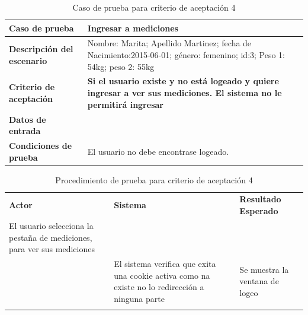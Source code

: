 \documentclass[a4paper,12pt]{article}
\begin{document}
		{\scriptsize
    \begin{table} [h]
    \centering
	\begin{tabular}{||l|p{10cm}||}
    	\rowcolor[gray]{0.9}
	    \hline 
        \hline 
		\textbf{Caso de prueba} & \textbf{Ingresar a mediciones} \\  \hline
	    \textbf{Descripción del escenario}& Nombre: Marita; Apellido Martinez; fecha de Nacimiento:2015-06-01; género: femenino; id:3; Peso 1: 54kg; peso 2: 55kg\\ \hline
	    \textbf{Criterio de aceptación}&\textbf{Si el usuario existe y no está logeado y quiere ingresar a ver sus mediciones. El sistema no le permitirá ingresar}\\ \hline
        \textbf{Datos de entrada}&  \\ \hline
        \textbf{Condiciones de  prueba}& El usuario no debe encontrase logeado.\\ \hline \hline
	    \end{tabular}
        \caption{Caso de prueba para criterio de aceptación 4}
    	\end{table}
		}
	

	\begin{longtable}{|p{5cm}|p{5cm}|p{5cm}|}
	    \hline \rowcolor[gray]{0.9}
        \multicolumn{3}{|l|}{\textbf{Procedimiento de Prueba -Ingresar mediciones}} \\ \hline
	    \textbf{Actor} & \textbf{Sistema}&\textbf{Resultado Esperado} \\  \hline
	   El usuario selecciona la pestaña de mediciones, para ver sus mediciones & & \\ \hline
        & El sistema  verifica que exita una cookie activa como na existe no lo redirección a ninguna parte &  Se muestra la ventana de logeo \\ \hline
   \caption{Procedimiento de prueba para criterio de aceptación 4}        
    \end{longtable}
 
\end{document}
